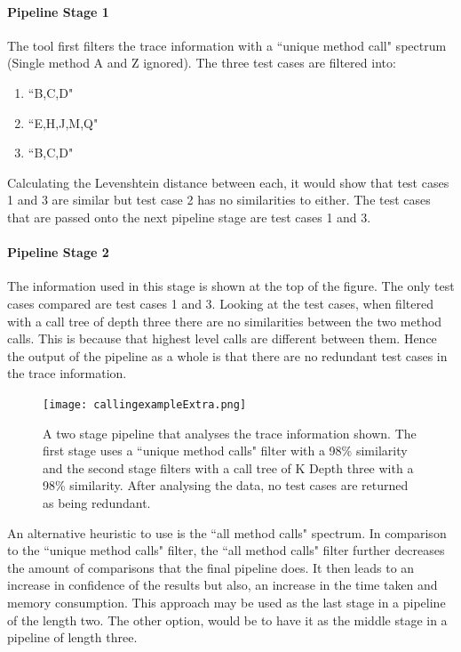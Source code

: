 \paragraph{Pipeline Stage 1}
The tool first filters the trace information with a ``unique method call" spectrum (Single method A and Z ignored). The three test cases are filtered into:

\begin{enumerate}
\item ``B,C,D" 
\item ``E,H,J,M,Q"
\item ``B,C,D"
\end{enumerate}

Calculating the Levenshtein distance between each, it would show that test cases 1 and 3 are similar but test case 2 has no similarities to either. The test cases that are passed onto the next pipeline stage are test cases 1 and 3.

\paragraph{Pipeline Stage 2}

The information used in this stage is shown at the top of the figure. The only test cases compared are test cases 1 and 3. Looking at the test cases, when filtered with a call tree of depth three there are no similarities between the two method calls. This is because that highest level calls are different between them. Hence the output of the pipeline as a whole is that there are no redundant test cases in the trace information.

\begin{figure}[h]
\texttt{[image: callingexampleExtra.png]}
\caption{A two stage pipeline that analyses the trace information shown. The first stage uses a ``unique method calls" filter with a 98\% similarity and the second stage filters with a call tree of K Depth three with a 98\% similarity. After analysing the data, no test cases are returned as being redundant.}
\label{fig:pipelineExample}
\end{figure}

An alternative heuristic to use is the ``all method calls" spectrum. In comparison to the ``unique method calls" filter, the ``all method calls" filter further decreases the amount of comparisons that the final pipeline does. It then leads to an increase in confidence of the results but also, an increase in the time taken and memory consumption. This approach may be used as the last stage in a pipeline of the length two. The other option, would be to have it as the middle stage in a pipeline of length three.

